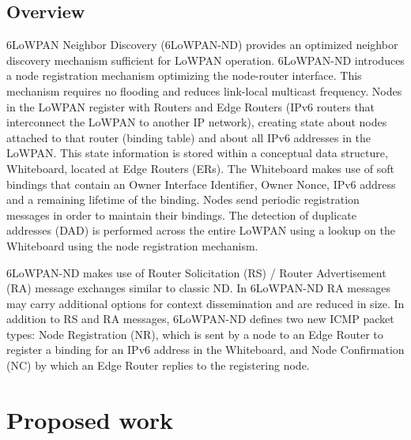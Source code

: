 \documentclass[12pt, titlepage, a4paper]{report}
\begin{document}
\section{Overview}\label{Overview}
6LoWPAN Neighbor Discovery (6LoWPAN-ND) provides an optimized neighbor discovery mechanism sufficient for LoWPAN operation. 6LoWPAN-ND introduces a node registration mechanism optimizing the node-router interface.  This mechanism requires no flooding and reduces link-local multicast frequency. Nodes in the LoWPAN register with Routers and Edge Routers (IPv6 routers that interconnect the LoWPAN to another IP network), creating state about nodes attached to that router (binding table) and about all IPv6 addresses in the LoWPAN. This state information is stored within a conceptual data structure, Whiteboard, located at Edge Routers (ERs). The Whiteboard makes use of soft bindings that contain an Owner Interface Identifier, Owner Nonce, IPv6 address and a remaining lifetime of the binding. Nodes send periodic registration messages in order to maintain their bindings. The detection of duplicate addresses (DAD) is performed across the entire LoWPAN using a lookup on the Whiteboard using the node registration mechanism.

6LoWPAN-ND makes use of Router Solicitation (RS) / Router Advertisement (RA) message exchanges similar to classic ND. In 6LoWPAN-ND RA messages may carry additional options for context dissemination and are reduced in size. In addition to RS and RA messages, 6LoWPAN-ND defines two new ICMP packet types: Node Registration (NR), which is sent by a node to an Edge Router to register a binding for an IPv6 address in the Whiteboard, and Node Confirmation (NC) by which an Edge Router replies to the registering node. 




\chapter*{Proposed work}

\newpage



\nocite{ieee802.15.4} 
\nocite{eui64} 
\nocite{rfc780}
\nocite{rfc2460}
\nocite{rfc2464}
\nocite{rfc2474}
\nocite{rfc3168}
\nocite{rfc3775}
\nocite{rfc4291} 
\nocite{rfc4443}
\nocite{rfc4861}
\nocite{rfc4862}
\nocite{rfc4919}
\nocite{rfc4944} 
\nocite{draft-usecases-05} 
\nocite{draft-hc-06} 
\nocite{draft-nd-07}
\end{document}
